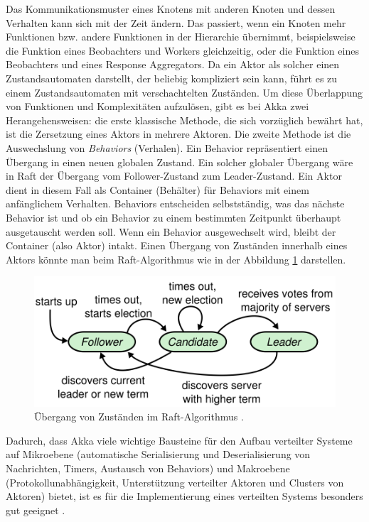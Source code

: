 Das Kommunikationsmuster eines Knotens mit anderen Knoten und dessen Verhalten kann sich mit der Zeit ändern. Das passiert, wenn ein Knoten mehr Funktionen bzw. andere Funktionen in der Hierarchie übernimmt, beispielsweise die Funktion eines Beobachters und Workers gleichzeitig, oder die Funktion eines Beobachters und eines Response Aggregators. Da ein Aktor als solcher einen Zustandsautomaten darstellt, der beliebig kompliziert sein kann, führt es zu einem Zustandsautomaten mit verschachtelten Zuständen. Um diese Überlappung von Funktionen und Komplexitäten aufzulösen, gibt es bei Akka zwei Herangehensweisen: die erste klassische Methode, die sich vorzüglich bewährt hat, ist die Zersetzung eines Aktors in mehrere Aktoren. Die zweite Methode ist die Auswechslung von \textit{Behaviors} (Verhalen). Ein Behavior repräsentiert einen Übergang in einen neuen globalen Zustand. Ein solcher globaler Übergang wäre in Raft der Übergang vom Follower-Zustand zum Leader-Zustand. Ein Aktor dient in diesem Fall als Container (Behälter) für Behaviors mit einem anfänglichem Verhalten. Behaviors entscheiden selbstständig, was das nächste Behavior ist und ob ein Behavior zu einem bestimmten Zeitpunkt überhaupt ausgetauscht werden soll. Wenn ein Behavior ausgewechselt wird, bleibt der Container (also Aktor) intakt. Einen Übergang von Zuständen innerhalb eines Aktors könnte man beim Raft-Algorithmus wie in der Abbildung \ref{fig:stateTransition} darstellen.

\begin{figure}
	\centering
	\includegraphics[width=0.7\linewidth]{images/4_state_transition}
	\caption{Übergang von Zuständen im Raft-Algorithmus \cite{Ongaro14insearch}.}
	\label{fig:stateTransition}
\end{figure}

Dadurch, dass Akka viele wichtige Bausteine für den Aufbau verteilter Systeme auf Mikroebene (automatische Serialisierung und Deserialisierung von Nachrichten, Timers, Austausch von Behaviors) und Makroebene (Protokollunabhängigkeit, Unterstützung verteilter Aktoren und Clusters von Aktoren) bietet, ist es für die Implementierung eines verteilten Systems besonders gut geeignet \cite{akka}.

